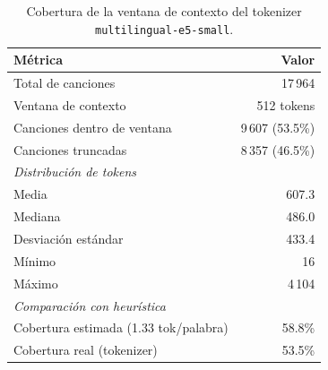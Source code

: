 \begin{table}[htbp]
\centering
\caption{Cobertura de la ventana de contexto del tokenizer \texttt{multilingual-e5-small}.}
\label{tab:token_coverage}
\begin{tabular}{lr}
\toprule
Métrica & Valor \\
\midrule
Total de canciones & 17\,964 \\
Ventana de contexto & 512 tokens \\
Canciones dentro de ventana & 9\,607 (53.5\%) \\
Canciones truncadas & 8\,357 (46.5\%) \\
\midrule
\multicolumn{2}{l}{\textit{Distribución de tokens}} \\
\midrule
Media & 607.3 \\
Mediana & 486.0 \\
Desviación estándar & 433.4 \\
Mínimo & 16 \\
Máximo & 4\,104 \\
\midrule
\multicolumn{2}{l}{\textit{Comparación con heurística}} \\
\midrule
Cobertura estimada (1.33 tok/palabra) & 58.8\% \\
Cobertura real (tokenizer) & 53.5\% \\
\bottomrule
\end{tabular}
\end{table}